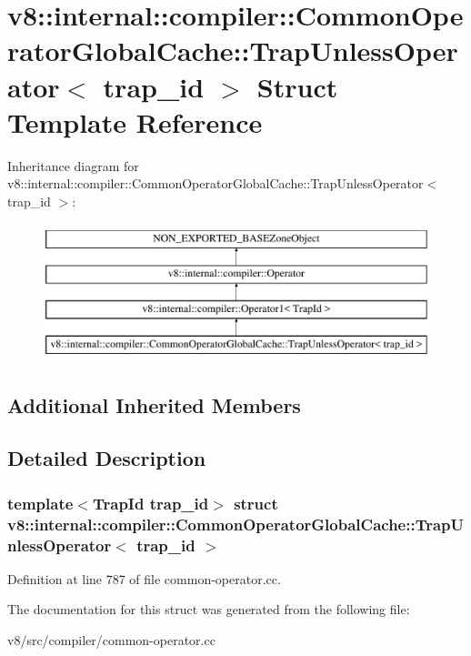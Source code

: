 \hypertarget{structv8_1_1internal_1_1compiler_1_1CommonOperatorGlobalCache_1_1TrapUnlessOperator}{}\section{v8\+:\+:internal\+:\+:compiler\+:\+:Common\+Operator\+Global\+Cache\+:\+:Trap\+Unless\+Operator$<$ trap\+\_\+id $>$ Struct Template Reference}
\label{structv8_1_1internal_1_1compiler_1_1CommonOperatorGlobalCache_1_1TrapUnlessOperator}
Inheritance diagram for v8\+:\+:internal\+:\+:compiler\+:\+:Common\+Operator\+Global\+Cache\+:\+:Trap\+Unless\+Operator$<$ trap\+\_\+id $>$\+:\begin{figure}[H]
\begin{center}
\leavevmode
\includegraphics[height=4.000000cm]{structv8_1_1internal_1_1compiler_1_1CommonOperatorGlobalCache_1_1TrapUnlessOperator}
\end{center}
\end{figure}
\subsection*{Additional Inherited Members}


\subsection{Detailed Description}
\subsubsection*{template$<$Trap\+Id trap\+\_\+id$>$\newline
struct v8\+::internal\+::compiler\+::\+Common\+Operator\+Global\+Cache\+::\+Trap\+Unless\+Operator$<$ trap\+\_\+id $>$}



Definition at line 787 of file common-\/operator.\+cc.



The documentation for this struct was generated from the following file\+:\begin{DoxyCompactItemize}
\item 
v8/src/compiler/common-\/operator.\+cc\end{DoxyCompactItemize}
